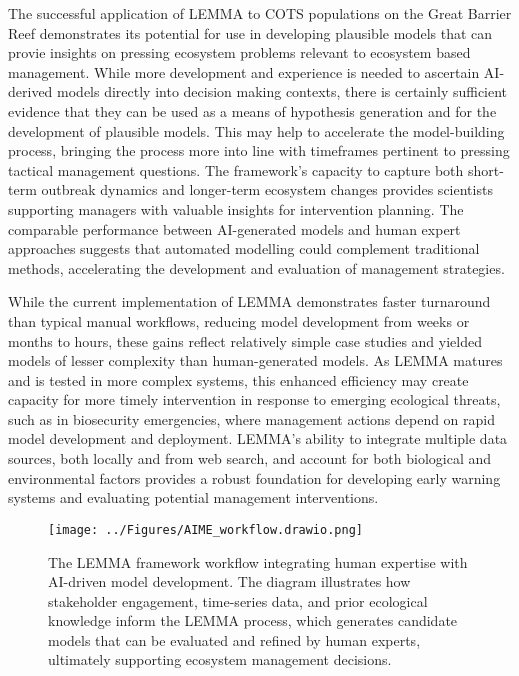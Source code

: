The successful application of LEMMA to COTS populations on the Great Barrier Reef demonstrates its potential for use in developing plausible models that can provie insights on pressing ecosystem problems relevant to ecosystem based management. While more development and experience is needed to ascertain AI-derived models directly into decision making contexts, there is certainly sufficient evidence that they can be used as a means of
hypothesis generation and for the development of plausible models. This may help to accelerate the model-building process, bringing the process more into line with timeframes pertinent to pressing tactical management questions. The framework's capacity to capture both short-term outbreak dynamics and longer-term ecosystem changes provides scientists supporting managers with valuable insights for intervention planning. The comparable performance between AI-generated models and human expert approaches suggests that automated modelling could complement traditional methods, accelerating the development and evaluation of management strategies.

While the current implementation of LEMMA demonstrates faster turnaround than typical manual workflows, reducing model development from weeks or months to hours, these gains reflect relatively simple case studies and yielded models of lesser complexity than human-generated models. As LEMMA matures and is tested in more complex systems, this enhanced efficiency may create capacity for more timely intervention in response to emerging ecological threats, such as in biosecurity emergencies, where management actions depend on rapid model development and deployment. LEMMA's ability to integrate multiple data sources, both locally and from web search, and account for both biological and environmental factors provides a robust foundation for developing early warning systems and evaluating potential management interventions.\

\begin{figure}[htbp]
    \centering
    \texttt{[image: ../Figures/AIME\_workflow.drawio.png]}
    \caption{The LEMMA framework workflow integrating human expertise with AI-driven model development. The diagram illustrates how stakeholder engagement, time-series data, and prior ecological knowledge inform the LEMMA process, which generates candidate models that can be evaluated and refined by human experts, ultimately supporting ecosystem management decisions.}
    \label{fig:aime_workflow}
\end{figure}


